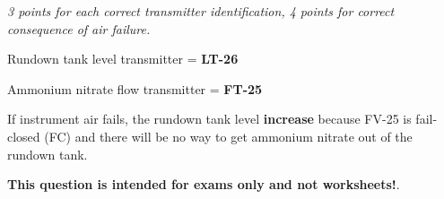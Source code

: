 





{\it 3 points for each correct transmitter identification, 4 points for correct consequence of air failure.}

\vskip 10pt

Rundown tank level transmitter = {\bf LT-26}

\vskip 10pt

Ammonium nitrate flow transmitter = {\bf FT-25}

\vskip 10pt

If instrument air fails, the rundown tank level {\bf increase} because FV-25 is fail-closed (FC) and there will be no way to get ammonium nitrate out of the rundown tank.








{\bf This question is intended for exams only and not worksheets!}.


